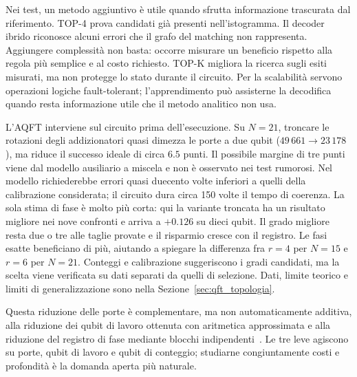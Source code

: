 \begin{onehalfspace}
Nei test, un metodo aggiuntivo è utile quando sfrutta informazione trascurata dal riferimento. TOP-4 prova candidati già presenti nell'istogramma. Il decoder ibrido riconosce alcuni errori che il grafo del matching non rappresenta. Aggiungere complessità non basta: occorre misurare un beneficio rispetto alla regola più semplice e al costo richiesto. TOP-K migliora la ricerca sugli esiti misurati, ma non protegge lo stato durante il circuito. Per la scalabilità servono operazioni logiche fault-tolerant; l'apprendimento può assisterne la decodifica quando resta informazione utile che il metodo analitico non usa.

L'AQFT interviene sul circuito prima dell'esecuzione. Su $N=21$, troncare le rotazioni degli addizionatori quasi dimezza le porte a due qubit ($49\,661\rightarrow23\,178$), ma riduce il successo ideale di circa $6.5$ punti. Il possibile margine di tre punti viene dal modello ausiliario a miscela e non è osservato nei test rumorosi. Nel modello richiederebbe errori quasi duecento volte inferiori a quelli della calibrazione considerata; il circuito dura circa 150 volte il tempo di coerenza. La sola stima di fase è molto più corta: qui la variante troncata ha un risultato migliore nei nove confronti e arriva a $+0.126$ su dieci qubit. Il grado migliore resta due o tre alle taglie provate e il risparmio cresce con il registro. Le fasi esatte beneficiano di più, aiutando a spiegare la differenza fra $r=4$ per $N=15$ e $r=6$ per $N=21$. Conteggi e calibrazione suggeriscono i gradi candidati, ma la scelta viene verificata su dati separati da quelli di selezione. Dati, limite teorico e limiti di generalizzazione sono nella Sezione~\ref{sec:qft_topologia}.

Questa riduzione delle porte è complementare, ma non automaticamente additiva,
alla riduzione dei qubit di lavoro ottenuta con aritmetica approssimata
\cite{chevignard2025,gidney2025} e alla riduzione del registro di fase mediante
blocchi indipendenti~\cite{shukla2026}. Le tre leve agiscono su porte, qubit di
lavoro e qubit di conteggio; studiarne congiuntamente costi e profondità è la
domanda aperta più naturale.

\end{onehalfspace}
